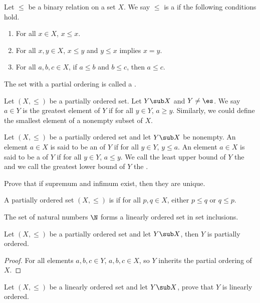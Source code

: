 \documentclass[10pt]{article}
\begin{document}
\begin{definition}
    Let $\le$ be a binary relation on a set $X$. We say $\le$ is a  if the following conditions hold.
    \begin{enumerate}
        \item For all $x\in X$, $x\le x$.
        \item For all $x,y\in X$, $x\le y$ and $y\le x$ implies $x=y$.
        \item For all $a,b,c\in X$, if $a\le b$ and $b\le c$, then $a\le c$.
    \end{enumerate}
    The set with a partial ordering is called a .
\end{definition}
\par
Let $(X,\le)$ be a partially ordered set. Let $Y\sub X$ and $Y\ne\es$. We say $a\in Y$ is the greatest element of $Y$ if for all $y\in Y$, $a\ge y$. Similarly, we could define the smallest element of a nonempty subset of $X$.
\begin{definition}
    Let $(X,\le)$ be a partially ordered set and let $Y\sub X$ be nonempty. An element $a\in X$ is said to be an  of $Y$ if for all $y\in Y$, $y\le a$. An element $a\in X$ is said to be a  of $Y$ if for all $y\in Y$, $a\le y$. We call the least upper bound of $Y$ the  and we call the greatest lower bound of $Y$ the .
\end{definition}
\begin{problem}
    Prove that if supremum and infimum exist, then they are unique.
\end{problem}
\begin{definition}
    A partially ordered set $(X,\le)$ is  if for all $p,q\in X$, either $p\le q$ or $q\le p$.
\end{definition}
\begin{example}
    The set of natural numbers $\N$ forms a linearly ordered set in set inclusions.
\end{example}
\begin{proposition}
    Let $(X,\le)$ be a partially ordered set and let $Y\sub X$, then $Y$ is partially ordered.
\end{proposition}
\begin{proof}
    For all elements $a,b,c\in Y$, $a,b,c\in X$, so $Y$ inherits the partial ordering of $X$.
\end{proof}
\begin{problem}
    Let $(X,\le)$ be a linearly ordered set and let $Y\sub X$, prove that $Y$ is linearly ordered.
\end{problem}
\end{document}
